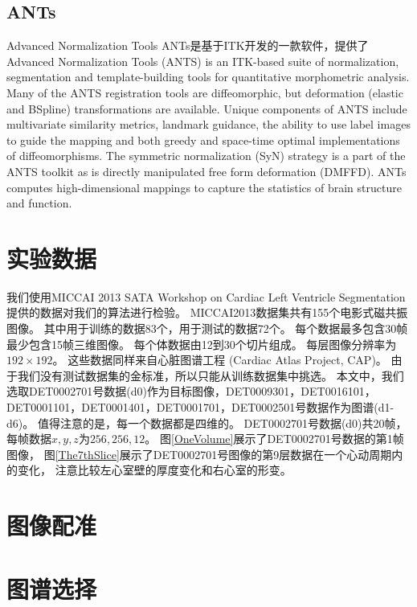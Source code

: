 \subsection{ANTs}
Advanced Normalization Tools
ANTs是基于ITK开发的一款软件，提供了
Advanced Normalization Tools (ANTS) is an ITK-based suite of normalization, segmentation and template-building tools for quantitative morphometric analysis. Many of the ANTS registration tools are diffeomorphic, but deformation (elastic and BSpline) transformations are available. Unique components of ANTS include multivariate similarity metrics, landmark guidance, the ability to use label images to guide the mapping and both greedy and space-time optimal implementations of diffeomorphisms. The symmetric normalization (SyN) strategy is a part of the ANTS toolkit as is directly manipulated free form deformation (DMFFD).
ANTs computes high-dimensional mappings to capture the statistics of brain structure and function. 

\section{实验数据}

我们使用MICCAI 2013 SATA Workshop on  Cardiac Left Ventricle Segmentation
提供的数据对我们的算法进行检验。
MICCAI2013数据集共有155个电影式磁共振图像。
其中用于训练的数据83个，用于测试的数据72个。
每个数据最多包含30帧最少包含15帧三维图像。
每个体数据由12到30个切片组成。
每层图像分辨率为$192\times192$。
这些数据同样来自心脏图谱工程
(Cardiac Atlas Project, CAP)。
由于我们没有测试数据集的金标准，所以只能从训练数据集中挑选。
本文中，我们选取DET0002701号数据(d0)作为目标图像，DET0009301，DET0016101，DET0001101，DET0001401，DET0001701，DET0002501号数据作为图谱(d1-d6)。
值得注意的是，每一个数据都是四维的。
DET0002701号数据(d0)共20帧，每帧数据$x,y,z$为$256,256,12$。
图\ref{OneVolume}展示了DET0002701号数据的第1帧图像，
图\ref{The7thSlice}展示了DET0002701号图像的第9层数据在一个心动周期内的变化，
注意比较左心室壁的厚度变化和右心室的形变。


\section{图像配准}


\section{图谱选择}

